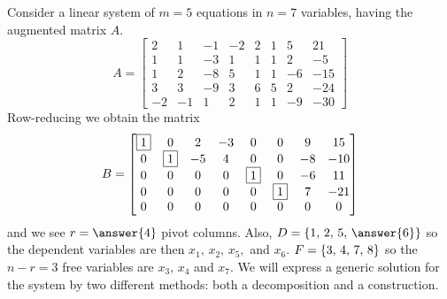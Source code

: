 \documentclass{ximera}
\begin{document}
\begin{example}
  Consider a linear system of $m=5$ equations in $n=7$ variables,
  having the augmented matrix $A$.
  \[
    A=
    \begin{bmatrix}
      2 & 1 & -1 & -2 & 2 & 1 & 5 & 21 \\
      1 & 1 & -3 & 1 & 1 & 1 & 2 & -5 \\
      1 & 2 & -8 & 5 & 1 & 1 & -6 & -15 \\
      3 & 3 & -9 & 3 & 6 & 5 & 2 & -24 \\
      -2 & -1 & 1 & 2 & 1 & 1 & -9 & -30
    \end{bmatrix}
  \]
  Row-reducing we obtain the matrix
  \[
    B=
    \begin{bmatrix}
      \fbox{1} & 0 & 2 & -3 & 0 & 0 & 9 &  15 \\
      0 & \fbox{1} & -5 & 4 & 0 & 0 & -8 &  -10 \\
      0 & 0 & 0 & 0 & \fbox{1} & 0 & -6 &  11 \\
      0 & 0 & 0 & 0 & 0 & \fbox{1} & 7 &  -21 \\
      0 & 0 & 0 & 0 & 0 & 0 & 0 & 0
    \end{bmatrix}
  \]
  and we see $r=\answer{4}$ pivot columns. Also,
  $D=\set{1,\,2,\,5,\,\answer{6}}$ so the dependent variables are then
  $x_1,\,x_2,\,x_5,$ and $x_6$.  $F=\left\{3,\,4,\,7,\,8\right\}$ so the
  $n-r=3$ free variables are $x_3,\,x_4$ and $x_7$.  We will express a
  generic solution for the system by two different methods: both a
  decomposition and a construction.


\end{example}
\end{document}
